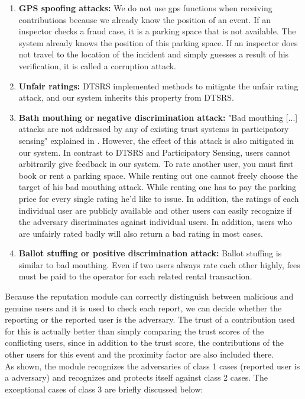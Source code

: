 \begin{enumerate}
\item \textbf{GPS spoofing attacks:} We do not use gps functions when receiving contributions because we already know the position of an event. If an inspector checks a fraud case, it is a parking space that is not available. The system already knows the position of this parking space. If an inspector does not travel to the location of the incident and simply guesses a result of his verification, it is called a corruption attack.
\item \textbf{Unfair ratings:} DTSRS implemented methods to mitigate the unfair rating attack, and our system inherits this property from DTSRS.
\item \textbf{Bath mouthing or negative discrimination attack:} "Bad mouthing [...] attacks are not addressed by any of existing trust systems in participatory sensing"  explained in \cite{mousa2015trust}. However, the effect of this attack is also mitigated in our system. In contrast to DTSRS and Participatory Sensing, users cannot arbitrarily give feedback in our system. To rate another user, you must first book or rent a parking space. While renting out one cannot freely choose the target of his bad mouthing attack. While renting one has to pay the parking price for every single rating he'd like to issue. In addition, the ratings of each individual user are publicly available and other users can easily recognize if the adversary discriminates against individual users. In addition, users who are unfairly rated badly will also return a bad rating in most cases.
\item \textbf{Ballot stuffing or positive discrimination attack:} Ballot stuffing is similar to bad mouthing. Even if two users always rate each other highly, fees must be paid to the operator for each related rental transaction.
\end{enumerate}

Because the reputation module can correctly distinguish between malicious and genuine users and it is used to check each report, we can decide whether the reporting or the reported user is the adversary. The trust of a contribution used for this is actually better than simply comparing the trust scores of the conflicting users, since in addition to the trust score, the contributions of the other users for this event and the proximity factor are also included there. \\

As shown, the module recognizes the adversaries of class 1 cases (reported user is a adversary) and recognizes and protects itself against class 2 cases. The exceptional cases of class 3 are briefly discussed below: 


